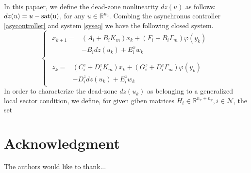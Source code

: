 \documentclass[conference]{IEEEtran}
\begin{document}
\\
In this papaer, we define the dead-zone nonlinearity $dz(u)$ as follows:$dz(u)=u-\rm{sat}(u)$, for any $u\in\mathbb{R}^{n_u}$. Combing the asynchronus controller \eqref{asycontroller} and system \eqref{syseq} we have the following closed system.
\begin{equation}\label{close_system_equation}
\left\{
\begin{array}{lr}
\begin{split}
x_{k+1}=&(A_i+B_iK_m)x_k+(F_i+B_i\varGamma_m)\varphi(y_k)\\
		&-B_idz(u_k)+E_i^xw_k\\
\end{split}
\\
\begin{split}
z_k=&(C^z_i+D_i^zK_m)x_k+(G^z_i+D^z_i\varGamma_m)\varphi(y_k)\\
&-D_i^zdz(u_k)+E^z_iw_k
\end{split}
\end{array}
\right.
\end{equation}
In order to characterize the dead-zone $dz(u_k)$ as belonging to a generalized local sector condition, we define, for given giben matrices $H_i\in\mathbb{R}^{n_x+n_y}, i\in\mathcal{N}$, the set 









\section*{Acknowledgment}


The authors would like to thank...






\end{document}

